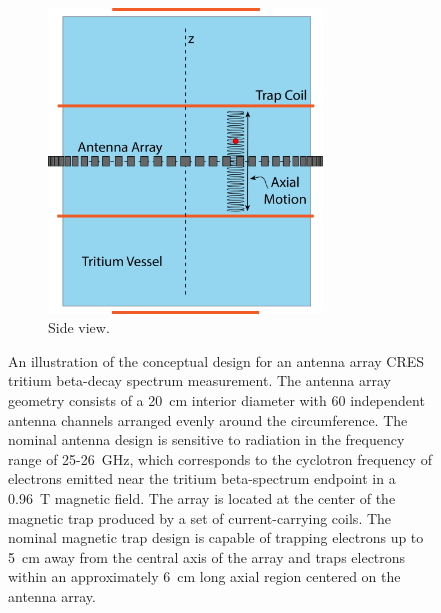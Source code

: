 \begin{figure}[h]
\begin{subfigure}{0.48\textwidth}
        \includegraphics[width=0.8\textwidth]{figs/Chapter-4/230328_deepfilter_paper_apparatus_concept_side_v2.png}
        \caption{Side view.}
        \label{fig:apparatus_concept_side}
    \end{subfigure}
    \caption{An illustration of the conceptual design for an antenna array CRES tritium beta-decay spectrum measurement. The antenna array geometry consists of a 20~cm interior diameter with 60 independent antenna channels arranged evenly around the circumference. The nominal antenna design is sensitive to radiation in the frequency range of 25-26~GHz, which corresponds to the cyclotron frequency of electrons emitted near the tritium beta-spectrum endpoint in a 0.96~T magnetic field. The array is located at the center of the magnetic trap produced by a set of current-carrying coils. The nominal magnetic trap design is capable of trapping electrons up to 5~cm away from the central axis of the array and traps electrons within an approximately 6~cm long axial region centered on the antenna array.}%
    \label{fig:apparatus_concept}
\end{figure}

